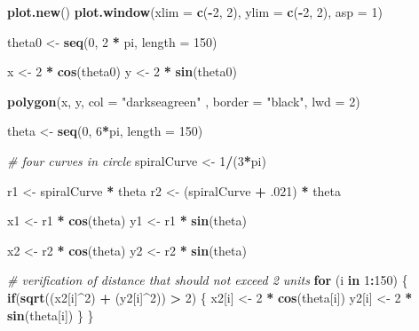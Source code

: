 \documentclass[]{article}
\newenvironment{Shaded}{\begin{snugshade}}{\end{snugshade}}
\newcommand{\KeywordTok}[1]{\textcolor[rgb]{0.13,0.29,0.53}{\textbf{#1}}}
\newcommand{\DataTypeTok}[1]{\textcolor[rgb]{0.13,0.29,0.53}{#1}}
\newcommand{\DecValTok}[1]{\textcolor[rgb]{0.00,0.00,0.81}{#1}}
\newcommand{\StringTok}[1]{\textcolor[rgb]{0.31,0.60,0.02}{#1}}
\newcommand{\CommentTok}[1]{\textcolor[rgb]{0.56,0.35,0.01}{\textit{#1}}}
\newcommand{\ControlFlowTok}[1]{\textcolor[rgb]{0.13,0.29,0.53}{\textbf{#1}}}
\newcommand{\OperatorTok}[1]{\textcolor[rgb]{0.81,0.36,0.00}{\textbf{#1}}}
\newcommand{\NormalTok}[1]{#1}
\begin{document}
\begin{Shaded}
\begin{Highlighting}[]
\KeywordTok{plot.new}\NormalTok{()}
\KeywordTok{plot.window}\NormalTok{(}\DataTypeTok{xlim =} \KeywordTok{c}\NormalTok{(}\OperatorTok{-}\DecValTok{2}\NormalTok{, }\DecValTok{2}\NormalTok{), }\DataTypeTok{ylim =} \KeywordTok{c}\NormalTok{(}\OperatorTok{-}\DecValTok{2}\NormalTok{, }\DecValTok{2}\NormalTok{), }\DataTypeTok{asp =} \DecValTok{1}\NormalTok{)}

\NormalTok{theta0 <-}\StringTok{ }\KeywordTok{seq}\NormalTok{(}\DecValTok{0}\NormalTok{, }\DecValTok{2} \OperatorTok{*}\StringTok{ }\NormalTok{pi, }\DataTypeTok{length =} \DecValTok{150}\NormalTok{)}

\NormalTok{x <-}\StringTok{ }\DecValTok{2} \OperatorTok{*}\StringTok{ }\KeywordTok{cos}\NormalTok{(theta0) }
\NormalTok{y <-}\StringTok{ }\DecValTok{2} \OperatorTok{*}\StringTok{ }\KeywordTok{sin}\NormalTok{(theta0)}

\KeywordTok{polygon}\NormalTok{(x, y, }\DataTypeTok{col =} \StringTok{"darkseagreen"}\NormalTok{ , }\DataTypeTok{border =} \StringTok{"black"}\NormalTok{, }\DataTypeTok{lwd =} \DecValTok{2}\NormalTok{)}

\NormalTok{theta <-}\StringTok{ }\KeywordTok{seq}\NormalTok{(}\DecValTok{0}\NormalTok{, }\DecValTok{6}\OperatorTok{*}\NormalTok{pi, }\DataTypeTok{length =} \DecValTok{150}\NormalTok{)}

\CommentTok{# four curves in circle}
\NormalTok{spiralCurve <-}\StringTok{ }\DecValTok{1}\OperatorTok{/}\NormalTok{(}\DecValTok{3}\OperatorTok{*}\NormalTok{pi)}

\NormalTok{r1 <-}\StringTok{ }\NormalTok{spiralCurve }\OperatorTok{*}\StringTok{ }\NormalTok{theta}
\NormalTok{r2 <-}\StringTok{ }\NormalTok{(spiralCurve }\OperatorTok{+}\StringTok{ }\NormalTok{.}\DecValTok{021}\NormalTok{) }\OperatorTok{*}\StringTok{ }\NormalTok{theta}

\NormalTok{x1 <-}\StringTok{ }\NormalTok{r1 }\OperatorTok{*}\StringTok{ }\KeywordTok{cos}\NormalTok{(theta) }
\NormalTok{y1 <-}\StringTok{ }\NormalTok{r1 }\OperatorTok{*}\StringTok{ }\KeywordTok{sin}\NormalTok{(theta)}

\NormalTok{x2 <-}\StringTok{ }\NormalTok{r2 }\OperatorTok{*}\StringTok{ }\KeywordTok{cos}\NormalTok{(theta)}
\NormalTok{y2 <-}\StringTok{ }\NormalTok{r2 }\OperatorTok{*}\StringTok{ }\KeywordTok{sin}\NormalTok{(theta)}

\CommentTok{# verification of distance that should not exceed 2 units}
\ControlFlowTok{for}\NormalTok{ (i }\ControlFlowTok{in} \DecValTok{1}\OperatorTok{:}\DecValTok{150}\NormalTok{) \{}
  \ControlFlowTok{if}\NormalTok{(}\KeywordTok{sqrt}\NormalTok{((x2[i]}\OperatorTok{^}\DecValTok{2}\NormalTok{) }\OperatorTok{+}\StringTok{ }\NormalTok{(y2[i]}\OperatorTok{^}\DecValTok{2}\NormalTok{)) }\OperatorTok{>}\StringTok{ }\DecValTok{2}\NormalTok{) \{}
\NormalTok{    x2[i] <-}\StringTok{ }\DecValTok{2} \OperatorTok{*}\StringTok{ }\KeywordTok{cos}\NormalTok{(theta[i])}
\NormalTok{    y2[i] <-}\StringTok{ }\DecValTok{2} \OperatorTok{*}\StringTok{ }\KeywordTok{sin}\NormalTok{(theta[i])}
\NormalTok{  \}}
\NormalTok{\}}


\end{Highlighting}
\end{Shaded}
\end{document}
